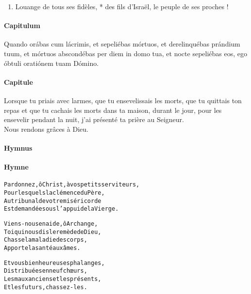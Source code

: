 \documentclass[twoside]{article}
\begin{document}
\begin{paracol}[1]{2}
\begin{enumerate}[wide, itemsep=0mm, labelwidth=!, labelindent=0pt, label=\color{gregoriocolor}\theenumi]
\item Louange de tous ses fidèles, *
des fils d’Israël, le peuple de ses proches !

\end{enumerate}
\switchcolumn*

\paragraph{Capitulum}
Quando orábas cum lácrimis, et sepeliébas mórtuos, et derelinquébas prándium tuum, et mórtuos abscondébas per diem in domo tua, et nocte sepeliébas eos, ego óbtuli oratiónem tuam Dómino.


\switchcolumn

\paragraph{Capitule}
 \capsaut Lorsque tu priais avec larmes, que tu ensevelissais les morts, que tu quittais ton repas et que tu cachais les morts dans ta maison, durant le jour, pour les ensevelir pendant la nuit, j’ai présenté ta prière au Seigneur.\\
\rr Nous rendons grâces à Dieu.

\switchcolumn*

\paragraph{Hymnus}


\switchcolumn

\paragraph{Hymne}
\begin{alltt}\normalfont



Pardonnez, ô Christ, à vos petits serviteurs,
Pour lesquels la clémence du Père,
Au tribunal de votre miséricorde
Est demandée sous l’appui de la Vierge.

Viens-nous en aide, ô Archange,
Toi qui nous dis le remède de Dieu,
Chasse la maladie des corps,
Apporte la santé aux âmes.

Et vous bienheureuses phalanges,
Distribuées en neuf chœurs,
Les maux anciens et les présents,
Et les futurs, chassez-les.

\newpage


\end{alltt}
\end{paracol}
\end{document}
